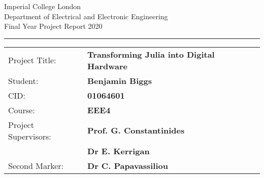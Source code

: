 \begin{titlepage}
                \setlength{\parindent}{0pt}
                \setlength{\parskip}{0pt}

                {
                                \Large
                                \raggedright
                                Imperial College London\\[17pt]
                                Department of Electrical and Electronic Engineering\\[17pt]
                                Final Year Project Report 2020\\[17pt]
 
                }

                \rule{\columnwidth}{3pt}
                \vfill
                \centering
                \vfill
                \setlength{\tabcolsep}{0pt}

                \begin{tabular}{p{40mm}p{\dimexpr\columnwidth-40mm}}
                                Project Title: & \textbf{Transforming Julia into Digital Hardware} \\[12pt]
                                Student: & \textbf{Benjamin Biggs} \\[12pt]
                                CID: & \textbf{01064601} \\[12pt]
                                Course: & \textbf{EEE4} \\[12pt]
                                Project Supervisors: & \textbf{Prof. G. Constantinides} \\[12pt]
                                 & \textbf{Dr E. Kerrigan} \\[12pt]
                                Second Marker: & \textbf{Dr C. Papavassiliou} \\
                \end{tabular}
\end{titlepage}